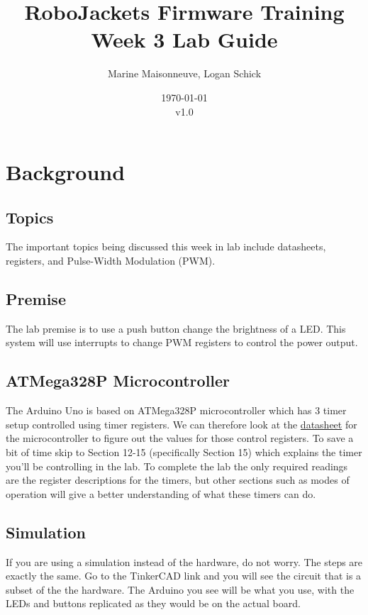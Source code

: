 \documentclass{article}
\title{RoboJackets Firmware Training Week 3 Lab Guide}
\author{Marine Maisonneuve, Logan Schick}
\date{\today\\v1.0}
\begin{document}
\maketitle{}
\setcounter{tocdepth}{2}
\tableofcontents
\pagebreak


\section{Background}
    \subsection{Topics}
        The important topics being discussed this week in lab include datasheets, registers, and Pulse-Width Modulation (PWM).
        
    \subsection{Premise}
        The lab premise is to use a push button change the brightness of a LED. This system will use interrupts to change PWM registers to control the power output.
        
    \subsection{ATMega328P Microcontroller}
        The Arduino Uno is based on ATMega328P microcontroller which has 3 timer setup controlled using timer registers. We can therefore look at the \href{https://www.sparkfun.com/datasheets/Components/SMD/ATMega328.pdf}{datasheet} for the microcontroller to figure out the values for those control registers. To save a bit of time skip to Section 12-15 (specifically Section 15) which explains the timer you’ll be controlling in the lab. To complete the lab the only required readings are the register descriptions for the timers, but other sections such as modes of operation will give a better understanding of what these timers can do.
        
    \subsection{Simulation}
        If you are using a simulation instead of the hardware, do not worry.  The steps are exactly the same. Go to the TinkerCAD link and you will see the circuit that is a subset of the the hardware. The Arduino you see will be what you use, with the LEDs and buttons replicated as they would be on the actual board.
        
\end{document}
